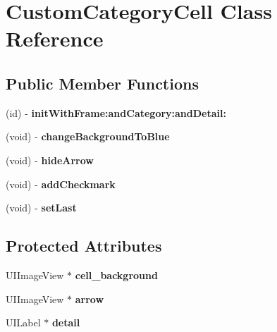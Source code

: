 \hypertarget{interface_custom_category_cell}{
\section{\-Custom\-Category\-Cell \-Class \-Reference}
\label{interface_custom_category_cell}
}
\subsection*{\-Public \-Member \-Functions}
\begin{DoxyCompactItemize}
\item 
\hypertarget{interface_custom_category_cell_abbc694ed6f8ae37055581a23bc88a465}{
(id) -\/ {\bfseries init\-With\-Frame\-:and\-Category\-:and\-Detail\-:}}
\label{interface_custom_category_cell_abbc694ed6f8ae37055581a23bc88a465}

\item 
\hypertarget{interface_custom_category_cell_a81e6d5f2c7d104ae8a9841906b6d889e}{
(void) -\/ {\bfseries change\-Background\-To\-Blue}}
\label{interface_custom_category_cell_a81e6d5f2c7d104ae8a9841906b6d889e}

\item 
\hypertarget{interface_custom_category_cell_a15731889c424d7db16dd5f7a93fb9f5c}{
(void) -\/ {\bfseries hide\-Arrow}}
\label{interface_custom_category_cell_a15731889c424d7db16dd5f7a93fb9f5c}

\item 
\hypertarget{interface_custom_category_cell_a2deac355ec7fd0733abfc3cf1c226f9d}{
(void) -\/ {\bfseries add\-Checkmark}}
\label{interface_custom_category_cell_a2deac355ec7fd0733abfc3cf1c226f9d}

\item 
\hypertarget{interface_custom_category_cell_a700bbf28c37e08998d205df52c19456d}{
(void) -\/ {\bfseries set\-Last}}
\label{interface_custom_category_cell_a700bbf28c37e08998d205df52c19456d}

\end{DoxyCompactItemize}
\subsection*{\-Protected \-Attributes}
\begin{DoxyCompactItemize}
\item 
\hypertarget{interface_custom_category_cell_ad65bb9bf057c12e53df65d9274a4561c}{
\-U\-I\-Image\-View $\ast$ {\bfseries cell\-\_\-background}}
\label{interface_custom_category_cell_ad65bb9bf057c12e53df65d9274a4561c}

\item 
\hypertarget{interface_custom_category_cell_a912ecfb0d8286b99c3ff5679a5c84831}{
\-U\-I\-Image\-View $\ast$ {\bfseries arrow}}
\label{interface_custom_category_cell_a912ecfb0d8286b99c3ff5679a5c84831}

\item 
\hypertarget{interface_custom_category_cell_afe09c063fa003aad22182bce4a14ad14}{
\-U\-I\-Label $\ast$ {\bfseries detail}}
\label{interface_custom_category_cell_afe09c063fa003aad22182bce4a14ad14}

\end{DoxyCompactItemize}
